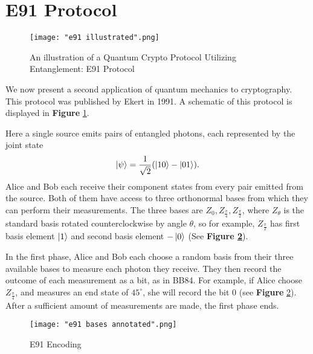 \section{E91 Protocol} \label{section: e91}
\begin{figure}[h]
    \centering
    \texttt{[image: "e91 illustrated".png]}
    \caption{An illustration of a Quantum Crypto Protocol Utilizing Entanglement: E91 Protocol \protect\footnotemark}
    \label{fig:E91 Illustrated}
\end{figure}


We now present a second application of quantum mechanics to cryptography.  This protocol was published by Ekert in 1991\cite{Ekert1991}.  A schematic of this protocol is displayed in {\bf{Figure}} \ref{fig:E91 Illustrated}.  

Here a single source emits pairs of entangled photons, each represented by the joint state 
$$\ket{\psi}= \frac{1}{\sqrt{2}}(\ket{10}-\ket{01}).$$
Alice and Bob each receive their component states from every pair emitted from the source. Both of them have access to three orthonormal bases from which they can perform their measurements.  The three bases are $Z_0, Z_{\frac{\pi}{4}}, Z_{\frac{\pi}{2}}$, where $Z_\theta$ is the standard basis rotated counterclockwise by angle $\theta$, so for example, $Z_{\frac{\pi}{2}}$ has first basis element $\ket{1}$ and second basis element $-\ket{0}$ (See \textbf{Figure \ref{fig:e91 encoding}}).


In the first phase, Alice and Bob each choose a random basis from their three available bases to measure each photon they receive. They then record the outcome of each measurement as a bit, as in BB84.  For example, if Alice choose $Z_{\frac{\pi}{4}}$, and measures an end state of $45^\circ$, she will record the bit $0$ (see {\bf{Figure}} \ref{fig:e91 encoding}).  After a sufficient amount of measurements are made, the first phase ends.  

\begin{figure}[h]
    \centering
    \texttt{[image: "e91 bases annotated".png]}
    \caption{E91 Encoding}
    \label{fig:e91 encoding}
\end{figure}



